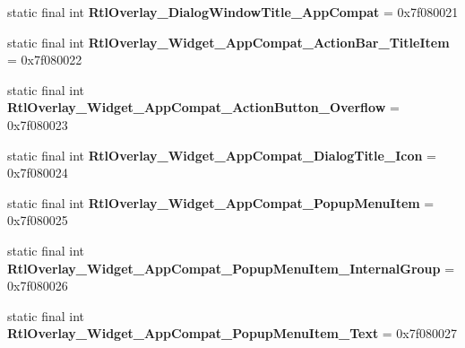 \begin{DoxyCompactItemize}
\item 
\hypertarget{classandroid_1_1support_1_1v7_1_1appcompat_1_1_r_1_1style_a9afb3efc2ad067987863fcb4c137113a}{}static final int {\bfseries Rtl\+Overlay\+\_\+\+Dialog\+Window\+Title\+\_\+\+App\+Compat} = 0x7f080021\label{classandroid_1_1support_1_1v7_1_1appcompat_1_1_r_1_1style_a9afb3efc2ad067987863fcb4c137113a}

\item 
\hypertarget{classandroid_1_1support_1_1v7_1_1appcompat_1_1_r_1_1style_a8126b14ed95f0bc8e4bfb220e9da09bd}{}static final int {\bfseries Rtl\+Overlay\+\_\+\+Widget\+\_\+\+App\+Compat\+\_\+\+Action\+Bar\+\_\+\+Title\+Item} = 0x7f080022\label{classandroid_1_1support_1_1v7_1_1appcompat_1_1_r_1_1style_a8126b14ed95f0bc8e4bfb220e9da09bd}

\item 
\hypertarget{classandroid_1_1support_1_1v7_1_1appcompat_1_1_r_1_1style_abbf763240ed37a6f4c9f9f1da0d46fbd}{}static final int {\bfseries Rtl\+Overlay\+\_\+\+Widget\+\_\+\+App\+Compat\+\_\+\+Action\+Button\+\_\+\+Overflow} = 0x7f080023\label{classandroid_1_1support_1_1v7_1_1appcompat_1_1_r_1_1style_abbf763240ed37a6f4c9f9f1da0d46fbd}

\item 
\hypertarget{classandroid_1_1support_1_1v7_1_1appcompat_1_1_r_1_1style_a0e4154ec705b54236d1e38b0d65755f7}{}static final int {\bfseries Rtl\+Overlay\+\_\+\+Widget\+\_\+\+App\+Compat\+\_\+\+Dialog\+Title\+\_\+\+Icon} = 0x7f080024\label{classandroid_1_1support_1_1v7_1_1appcompat_1_1_r_1_1style_a0e4154ec705b54236d1e38b0d65755f7}

\item 
\hypertarget{classandroid_1_1support_1_1v7_1_1appcompat_1_1_r_1_1style_ae1bae14f1eb7c8efb1126019df2b46c5}{}static final int {\bfseries Rtl\+Overlay\+\_\+\+Widget\+\_\+\+App\+Compat\+\_\+\+Popup\+Menu\+Item} = 0x7f080025\label{classandroid_1_1support_1_1v7_1_1appcompat_1_1_r_1_1style_ae1bae14f1eb7c8efb1126019df2b46c5}

\item 
\hypertarget{classandroid_1_1support_1_1v7_1_1appcompat_1_1_r_1_1style_a8de9fa977b83ffcd83f9d6c0f210664d}{}static final int {\bfseries Rtl\+Overlay\+\_\+\+Widget\+\_\+\+App\+Compat\+\_\+\+Popup\+Menu\+Item\+\_\+\+Internal\+Group} = 0x7f080026\label{classandroid_1_1support_1_1v7_1_1appcompat_1_1_r_1_1style_a8de9fa977b83ffcd83f9d6c0f210664d}

\item 
\hypertarget{classandroid_1_1support_1_1v7_1_1appcompat_1_1_r_1_1style_a27940d2a97fcebbe0e833376ce4c05fc}{}static final int {\bfseries Rtl\+Overlay\+\_\+\+Widget\+\_\+\+App\+Compat\+\_\+\+Popup\+Menu\+Item\+\_\+\+Text} = 0x7f080027\label{classandroid_1_1support_1_1v7_1_1appcompat_1_1_r_1_1style_a27940d2a97fcebbe0e833376ce4c05fc}


\end{DoxyCompactItemize}
